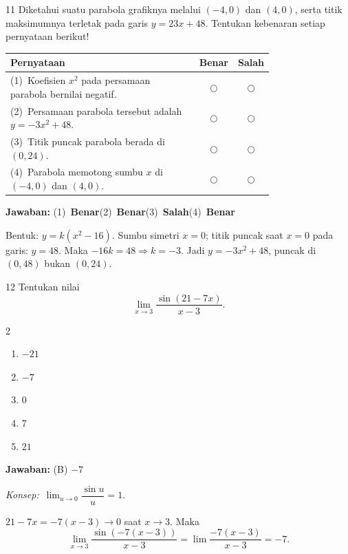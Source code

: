 \documentclass[11pt]{article}
\newcommand{\jawaban}[1]{%
  \noindent\colorbox{gold!30}{\parbox{\dimexpr\linewidth-2\fboxsep\relax}{%
    \textbf{Jawaban:} #1}}\par\smallskip}
\newcommand{\konsep}{\noindent\textit{Konsep:}\ \ignorespaces}
\newenvironment{pilB}{%
  \par\smallskip\begin{multicols}{2}
  \begin{enumerate}[label=(\Alph*),leftmargin=*,itemsep=1pt,topsep=3pt]}%
  {\end{enumerate}\end{multicols}}
\begin{document}
\begin{soal}{11}
Diketahui suatu parabola grafiknya melalui $(-4,0)$ dan $(4,0)$,
serta titik maksimumnya terletak pada garis $y=23x+48$.
Tentukan kebenaran setiap pernyataan berikut!

\par\smallskip
{\renewcommand{\arraystretch}{1.4}%
\begin{tabular}{@{}p{0.76\linewidth}cc@{}}
\hline
\textbf{Pernyataan} & \textbf{Benar} & \textbf{Salah}\\
\hline
(1)~Koefisien $x^2$ pada persamaan parabola bernilai negatif.
  & $\bigcirc$ & $\bigcirc$\\
(2)~Persamaan parabola tersebut adalah $y=-3x^2+48$.
  & $\bigcirc$ & $\bigcirc$\\
(3)~Titik puncak parabola berada di $(0,24)$.
  & $\bigcirc$ & $\bigcirc$\\
(4)~Parabola memotong sumbu $x$ di $(-4,0)$ dan $(4,0)$.
  & $\bigcirc$ & $\bigcirc$\\
\hline
\end{tabular}}
\end{soal}
\begin{pembox}
\jawaban{(1)~\textbf{Benar}\quad(2)~\textbf{Benar}\quad(3)~\textbf{Salah}\quad(4)~\textbf{Benar}}
Bentuk: $y=k(x^2-16)$. Sumbu simetri $x=0$; titik puncak saat $x=0$ pada garis: $y=48$. Maka $-16k=48\Rightarrow k=-3$. Jadi $y=-3x^2+48$, puncak di $(0,48)$ bukan $(0,24)$.
\end{pembox}

\begin{soal}{12}
Tentukan nilai
\[
  \lim_{x\to 3}\frac{\sin(21-7x)}{x-3}.
\]
\begin{pilB}
  \item $-21$ \item $-7$ \item $0$ \item $7$ \item $21$
\end{pilB}
\end{soal}
\begin{pembox}
\jawaban{(B) $-7$}
\konsep $\lim_{u\to 0}\dfrac{\sin u}{u}=1$.

$21-7x=-7(x-3)\to0$ saat $x\to3$. Maka
\[ \lim_{x\to 3}\frac{\sin(-7(x-3))}{x-3}=\lim\frac{-7(x-3)}{x-3}=-7. \]
\end{pembox}
\end{document}
